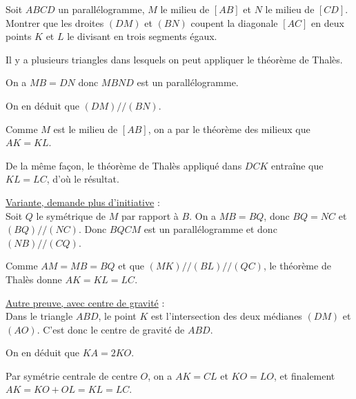 \begin{exo}
Soit $ABCD$ un parallélogramme, $M$ le milieu de $[AB]$ et $N$ le milieu de $[CD]$. Montrer que les droites $(DM)$ et $(BN)$ coupent la diagonale $[AC]$ en deux points $K$ et $L$ le divisant en trois segments égaux.
\begin{center}
\end{center}

\begin{hint}
Il y a plusieurs triangles dans lesquels on peut appliquer le théorème de Thalès.
\end{hint}
\begin{sol}
On a $MB=DN$ donc $MBND$ est un parallélogramme.

On en déduit que $(DM)//(BN)$.

Comme $M$ est le milieu de $[AB]$, on a par le théorème des milieux que $AK=KL$.

De la même façon, le théorème de Thalès appliqué dans $DCK$ entraîne que $KL=LC$, d'où le résultat.

\underline{Variante, demande plus d'initiative} :\\
Soit $Q$ le symétrique de $M$ par rapport à $B$. On a $MB=BQ$, donc $BQ=NC$ et $(BQ)//(NC)$. Donc $BQCM$ est un parallélogramme et donc $(NB)//(CQ)$.

Comme $AM=MB=BQ$ et que $(MK)//(BL)//(QC)$, le théorème de Thalès donne $AK=KL=LC$.

\underline{Autre preuve, avec centre de gravité} :\\
Dans le triangle $ABD$, le point $K$ est l'intersection des deux médianes $(DM)$ et $(AO)$. C'est donc le centre de gravité de $ABD$.

On en déduit que $KA = 2KO$.

Par symétrie centrale de centre $O$, on a $AK=CL$ et $KO=LO$, et finalement $AK = KO+OL = KL = LC$.
\end{sol}
\end{exo}


